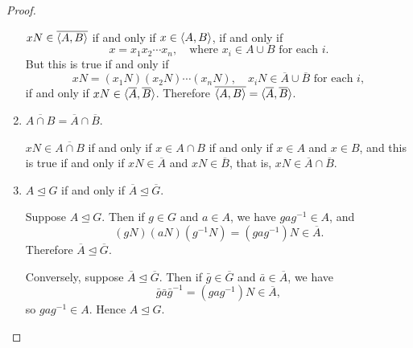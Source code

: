 \begin{proof}
\begin{enumerate}
    $xN\in\overline{\langle{A,B}\rangle}$ if and only if $x\in\langle{A,B}\rangle$, if and
    only if
    \begin{equation*}
      x = x_1x_2\cdots x_n,
      \quad\text{where $x_i\in A\cup B$ for each $i$}.
    \end{equation*}
    But this is true if and only if
    \begin{equation*}
      xN = (x_1N)(x_2N)\cdots(x_nN),
      \quad\text{$x_iN\in\overline{A}\cup\overline{B}$ for each $i$},
    \end{equation*}
    if and only if $xN\in\langle{\overline{A},\overline{B}}\rangle$. Therefore
    $\overline{\langle{A,B}\rangle} = \langle{\overline{A},\overline{B}}\rangle$.
  \item $\overline{A\cap B} = \overline{A}\cap\overline{B}$.

    $xN \in \overline{A\cap B}$ if and only if $x\in A\cap B$ if and
    only if $x\in A$ and $x\in B$, and this is true if and only if
    $xN\in\overline{A}$ and $xN\in\overline{B}$, that is,
    $xN\in\overline{A}\cap\overline{B}$.
  \item $A\trianglelefteq G$ if and only if
    $\overline{A}\trianglelefteq\overline{G}$.

    Suppose $A\trianglelefteq G$. Then if $g\in G$ and $a\in A$, we
    have $gag^{-1}\in A$, and
    \begin{equation*}
      (gN)(aN)(g^{-1}N)
      = (gag^{-1})N
      \in\overline{A}.
    \end{equation*}
    Therefore $\overline{A}\trianglelefteq\overline{G}$.

    Conversely, suppose
    $\overline{A}\trianglelefteq\overline{G}$. Then if
    $\bar{g}\in\overline{G}$ and $\bar{a}\in\overline{A}$, we have
    \begin{equation*}
      \bar{g}\bar{a}\bar{g}^{-1}
      = (gag^{-1})N \in \overline{A},
    \end{equation*}
    so $gag^{-1}\in A$. Hence $A\trianglelefteq G$. \qedhere
  \end{enumerate}
\end{proof}

